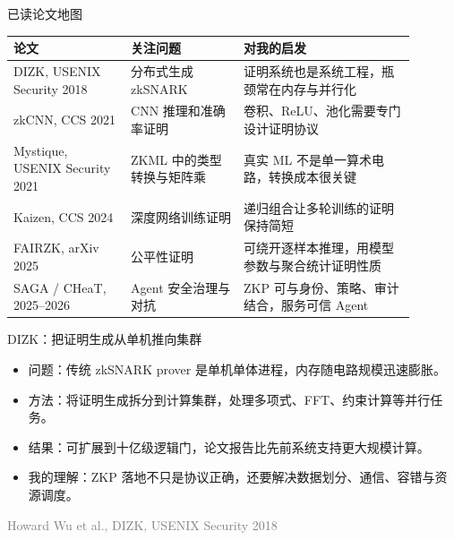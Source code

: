 \documentclass[aspectratio=169]{beamer}
\newcommand{\smallcite}[1]{\textcolor{gray}{\scriptsize #1}}
\begin{document}
\begin{frame}{已读论文地图}
  \begin{table}
    \centering
    \scriptsize
    \begin{tabular}{p{0.26\linewidth}p{0.25\linewidth}p{0.38\linewidth}}
      \toprule
      论文 & 关注问题 & 对我的启发 \\
      \midrule
      DIZK, USENIX Security 2018 & 分布式生成 zkSNARK & 证明系统也是系统工程，瓶颈常在内存与并行化 \\
      zkCNN, CCS 2021 & CNN 推理和准确率证明 & 卷积、ReLU、池化需要专门设计证明协议 \\
      Mystique, USENIX Security 2021 & ZKML 中的类型转换与矩阵乘 & 真实 ML 不是单一算术电路，转换成本很关键 \\
      Kaizen, CCS 2024 & 深度网络训练证明 & 递归组合让多轮训练的证明保持简短 \\
      FAIRZK, arXiv 2025 & 公平性证明 & 可绕开逐样本推理，用模型参数与聚合统计证明性质 \\
      SAGA / CHeaT, 2025--2026 & Agent 安全治理与对抗 & ZKP 可与身份、策略、审计结合，服务可信 Agent \\
      \bottomrule
    \end{tabular}
  \end{table}
\end{frame}

\begin{frame}{DIZK：把证明生成从单机推向集群}
  \begin{itemize}
    \item 问题：传统 zkSNARK prover 是单机单体进程，内存随电路规模迅速膨胀。
    \item 方法：将证明生成拆分到计算集群，处理多项式、FFT、约束计算等并行任务。
    \item 结果：可扩展到十亿级逻辑门，论文报告比先前系统支持更大规模计算。
    \item 我的理解：ZKP 落地不只是协议正确，还要解决数据划分、通信、容错与资源调度。
  \end{itemize}
  \smallcite{Howard Wu et al., DIZK, USENIX Security 2018}
\end{frame}
\end{document}
